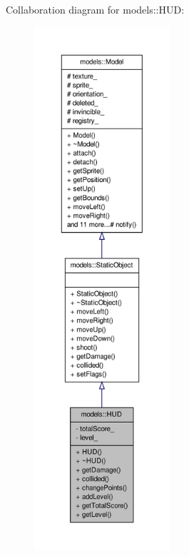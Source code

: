 \-Collaboration diagram for models\-:\-:\-H\-U\-D\-:\nopagebreak
\begin{figure}[H]
\begin{center}
\leavevmode
\includegraphics[height=550pt]{da/df8/classmodels_1_1HUD__coll__graph}
\end{center}
\end{figure}
